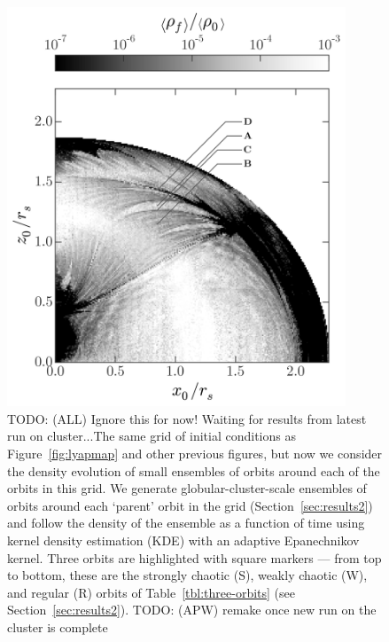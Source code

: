 \documentclass[letterpaper,12pt,preprint]{aastex}
\newcommand{\todo}[2]{{\color{red} TODO: (\MakeUppercase{#1}) #2}}
\begin{document}
\clearpage
\begin{figure}[p]
\begin{center}
\includegraphics[width=0.9\textwidth, trim={0 1cm 0 0}]{figures/ensemble-map.png}
\caption{\todo{all}{Ignore this for now! Waiting for results from latest run on cluster...}The same grid of initial conditions as Figure~\ref{fig:lyapmap} and other previous figures, but now we consider the density evolution of small ensembles of orbits around each of the orbits in this grid. We generate globular-cluster-scale ensembles of orbits around each `parent' orbit in the grid (Section~\ref{sec:results2}) and follow the density of the ensemble as a function of time using kernel density estimation (KDE) with an adaptive Epanechnikov kernel. Three orbits are highlighted with square markers --- from top to bottom, these are the strongly chaotic (S), weakly chaotic (W), and regular (R) orbits of Table~\ref{tbl:three-orbits} (see Section~\ref{sec:results2}). \todo{apw}{remake once new run on the cluster is complete}} 
\label{fig:ensemblemap-meandensity}
\end{center}
\end{figure}
\end{document}
